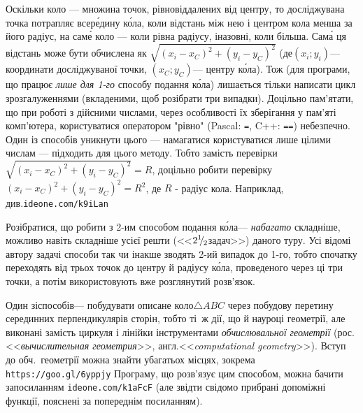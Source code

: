 \Tutorial	Оскільки коло --- множина точок, рівновіддалених від центру, то досліджувана точка потрапляє всер\'{е}дину к\'{о}ла, коли відстань між нею і центром кола менша за його радіус, на сам\'{е} коло --- коли рівна радіусу, і\nolinebreak[3] назовні, коли більша. Сам\'{а} ця відстань може бути обчислена як $\sqrt{(x_i-x_C)^2+(y_i-y_C)^2}$ (де\nolinebreak[3] $(x_i; y_i)$\nolinebreak[3] --- координати досліджуваної точки, $(x_C; y_C)$\nolinebreak[3] --- центру к\'{о}ла). Тож (для програми, що працює \emph{лише для \mbox{1-го}} способу подання к\'{о}ла) лишається тільки написати цикл з\nolinebreak[3] розгалуженнями (вкладеними, щоб розібрати три випадки). Доцільно пам'ятати, що при роботі з дійсними числами, через особливості їх зберігання у пам'яті комп'ютера, користуватися оператором "рівно" (Pascal: \verb"=", C++: \verb"==") небезпечно. Один із способів уникнути цього --- намагатися користуватися лише цілими числам --- підходить для цього методу. Тобто замість перевірки $\sqrt{(x_i-x_C)^2+(y_i-y_C)^2}=R$, доцільно робити перевірку $(x_i-x_C)^2+(y_i-y_C)^2=R^2$, де $R$ - радіус кола. Наприклад, див.\nolinebreak[3] \verb"ideone.com/k9iLan"

Розібратися, що робити з \mbox{2-им} способом подання к\'{о}ла\nolinebreak[3] --- \emph{набагато} складніше, можливо навіть складніше усієї решти 
(<<${2\lefteqn{{}^{1}}{}^{\,}\lefteqn{/}{}_{\,\,\,2}}$\nolinebreak[3] задач>>) даного туру. Усі відомі автору задачі способи так чи інакше зводять \mbox{2-ий} випадок до \mbox{1-го}, тобто спочатку переходять від трьох точок до центру й радіусу к\'{о}ла, проведеного через ці три точки, а потім використовують вже розглянутий розв'язок.

Один зі\nolinebreak[3] способів\nolinebreak[3] --- побудувати описане коло\nolinebreak[2] $\triangle{}ABC$ через побудову перетину серединних перпендикулярів сторін, тобто ті~ж дії, що й на\nolinebreak[3] уроці геометрії, але виконані замість циркуля і лінійки інструментами \emph{обчислювальної геометрії} (рос.\nolinebreak[2] <<\emph{вычислительная геометрия}>>, англ.\nolinebreak[2] <<\emph{computational geometry}>>). Вступ до обч.~геометрії можна знайти у\nolinebreak[3] багатьох місцях, зокрема \verb"https://goo.gl/6yppjy"\hspace{0.5em plus 1em} Програму, що розв'язує цим способом, можна бачити за\nolinebreak[3] посиланням \verb"ideone.com/k1aFcF" (але звідти свідомо прибрані допоміжні функції, пояснені за попереднім посиланням).

